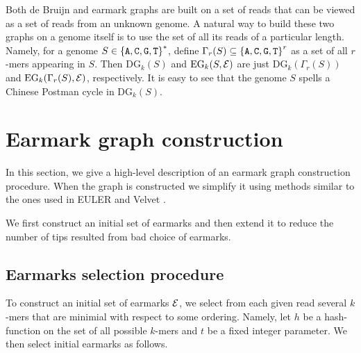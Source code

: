 \documentclass[12pt]{article}
\def\acgt{\{{\tt A,C,G,T}\}}
\begin{document}
Both de Bruijn and earmark graphs are built on a set of reads that can be viewed as a 
set of reads from an unknown genome. A natural way to build these two graphs on a genome
itself is to use the set of all its reads of a particular length. Namely, 
for a genome $S \in {\acgt}^*$, define $\Gamma_r(S) \subseteq {\acgt}^r$
as a set of all $r$-mers appearing in $S$. Then $\textrm{DG}_k(S)$ 
and $\textrm{EG}_k(S, {\cal E})$
are just $\textrm{DG}_k(\Gamma_r(S))$ and $\textrm{EG}_k(\Gamma_r(S), {\cal E})$, respectively.
It is easy to see that the genome $S$ spells a Chinese Postman cycle in 
$\textrm{DG}_k(S)$.

\section{Earmark graph construction}
In this section, we give a high-level description of an earmark graph construction procedure.
When the graph is constructed we simplify it using methods similar to the ones used in
EULER \cite{PPT04} and Velvet \cite{Z08}.

We first construct an initial set of earmarks and then extend it to reduce 
the number of tips
resulted from bad choice of earmarks.

\subsection{Earmarks selection procedure}
To construct an initial set of earmarks ${\cal E}$, we select from each given read 
several $k$-mers that are minimial with respect to some ordering. Namely, 
let $h$ be a hash-function on the set of all possible $k$-mers and $t$ be a 
fixed integer parameter.
We then select initial earmarks as follows.


\end{document}
